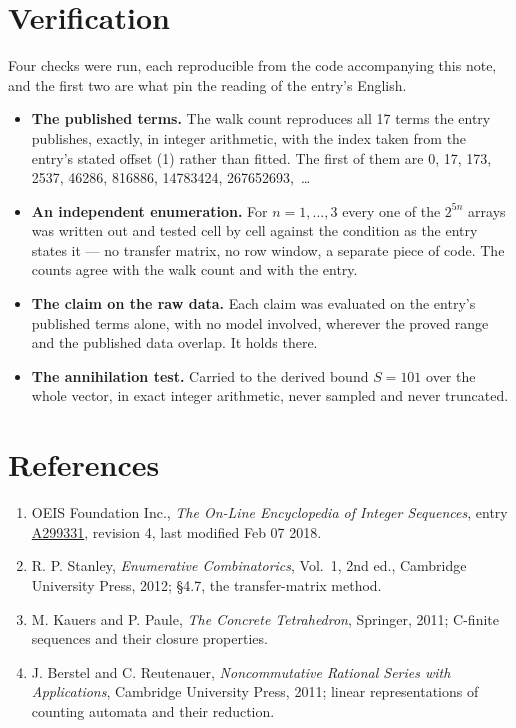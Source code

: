 \documentclass[11pt]{article}
\theoremstyle{definition}
\begin{document}
\section{Verification}

Four checks were run, each reproducible from the code accompanying this note, and the first two are what pin the reading of the entry's English.

\begin{itemize}

\item {\bfseries The published terms.} The walk count reproduces all 17 terms the entry publishes, exactly, in integer arithmetic, with the index taken from the entry's stated offset (1) rather than fitted. The first of them are 0, 17, 173, 2537, 46286, 816886, 14783424, 267652693,~\dots

\item {\bfseries An independent enumeration.} For $n = 1,\dots,3$ every one of the $2^{5n}$ arrays was written out and tested cell by cell against the condition as the entry states it --- no transfer matrix, no row window, a separate piece of code. The counts agree with the walk count and with the entry.

\item {\bfseries The claim on the raw data.} Each claim was evaluated on the entry's published terms alone, with no model involved, wherever the proved range and the published data overlap. It holds there.

\item {\bfseries The annihilation test.} Carried to the derived bound $S = 101$ over the whole vector, in exact integer arithmetic, never sampled and never truncated.

\end{itemize}

\section{References}

\begin{enumerate}

\item OEIS Foundation Inc., \emph{The On-Line Encyclopedia of Integer Sequences}, entry \href{https://oeis.org/A299331}{A299331}, revision 4, last modified Feb 07 2018.

\item R. P. Stanley, \emph{Enumerative Combinatorics}, Vol.~1, 2nd ed., Cambridge University Press, 2012; \S4.7, the transfer-matrix method.

\item M. Kauers and P. Paule, \emph{The Concrete Tetrahedron}, Springer, 2011; C-finite sequences and their closure properties.

\item J. Berstel and C. Reutenauer, \emph{Noncommutative Rational Series with Applications}, Cambridge University Press, 2011; linear representations of counting automata and their reduction.

\end{enumerate}
\end{document}
